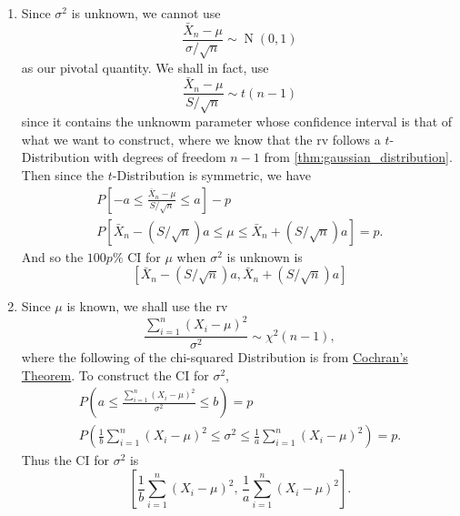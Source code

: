 \documentclass[notoc,notitlepage]{tufte-book}
\DeclareMathOperator{\Nor}{N }
\begin{document}
\begin{solution}
  \begin{enumerate}
    \item Since $\sigma^2$ is unknown, we cannot use
      \begin{equation*}
        \frac{\bar{X}_n - \mu}{\sigma / \sqrt{n}} \sim \Nor(0, 1)
      \end{equation*}
      as our pivotal quantity. We shall in fact, use
      \begin{equation*}
        \frac{\bar{X}_n - \mu}{S / \sqrt{n}} \sim t(n - 1)
      \end{equation*}
      since it contains the unknowm parameter whose confidence interval is that of what we want to construct, where we know that the rv follows a $t$-Distribution with degrees of freedom $n - 1$ from \cref{thm:gaussian_distribution}. Then since the $t$-Distribution is symmetric, we have
      \begin{gather*}
        P\left[ -a \leq \frac{\bar{X}_n - \mu}{S / \sqrt{n}} \leq a \right] - p \\
        P\left[ \bar{X}_n - (S / \sqrt{n}) a \leq \mu \leq \bar{X}_n + (S / \sqrt{n}) a \right] = p.
      \end{gather*}
      And so the $100p\%$ CI for $\mu$ when $\sigma^2$ is unknown is
      \begin{equation*}
        \left[ \bar{X}_n - (S / \sqrt{n}) a , \bar{X}_n + (S / \sqrt{n}) a \right]
      \end{equation*}

    \item Since $\mu$ is known, we shall use the rv
      \begin{equation*}
        \frac{\sum\limits_{i=1}^{n} (X_i - \mu)^2}{\sigma^2} \sim \chi^2 (n - 1),
      \end{equation*}
      where the following of the chi-squared Distribution is from \hyperref[thm:gaussian_distribution]{Cochran's Theorem}. To construct the CI for $\sigma^2$,
      \begin{gather*}
        P\left(a \leq \frac{\sum\limits_{i=1}^{n} (X_i - \mu)^2}{\sigma^2} \leq b\right) = p \\
        P\left( \frac{1}{b} \sum_{i=1}^{n} (X_i - \mu)^2 \leq \sigma^2 \leq \frac{1}{a} \sum_{i=1}^{n} (X_i - \mu)^2 \right) = p.
      \end{gather*}
      Thus the CI for $\sigma^2$ is
      \begin{equation*}
        \left[ \frac{1}{b} \sum_{i=1}^{n} (X_i - \mu)^2, \, \frac{1}{a} \sum_{i=1}^{n} (X_i - \mu)^2 \right].
      \end{equation*}
  \end{enumerate}
\end{solution}
\end{document}
